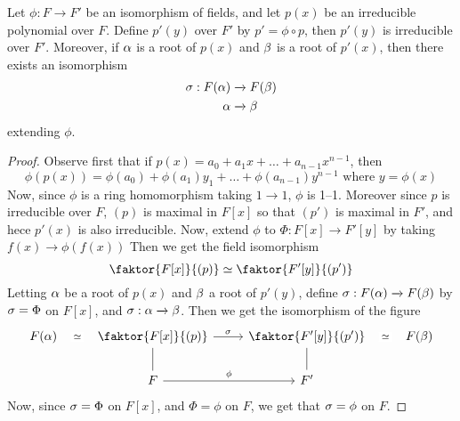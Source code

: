 \begin{theorem}\label{theorem_8.1.9}
  Let $\phi:F \xrightarrow{} F'$ be an isomorphism of fields, and let
  $p(x)$ be an irreducible polynomial over $F$. Define  $p'(y)$ over
  $F'$ by $p'=\phi \circ p$, then $p'(y)$ is irreducible over $F'$.
  Moreover, if $\alpha$ is a root of $p(x)$ and $\beta$ is a root of $p'(x)$,
  then there exists an isomorphism
  \begin{align*}
    \sigma: F(\alpha) & \xrightarrow{} F(\beta)  \\
    \alpha  & \xrightarrow{} \beta \\
  \end{align*}
  extending $\phi$.
\end{theorem}
\begin{proof}
  Observe first that if $p(x)=a_0+a_1x+\dots+a_{n-1}x^{n-1}$, then
  \begin{equation*}
    \phi(p(x))=\phi(a_0)+\phi(a_1)y_1+\dots+\phi(a_{n-1})y^{n-1}
    \text{ where } y=\phi(x)
  \end{equation*}
  Now, since $\phi$ is a ring homomorphism taking
  $1 \xrightarrow{} 1$, $\phi$ is 1--1. Moreover since $p$ is irreducible
  over $F$,  $(p)$ is maximal in $F[x]$ so that $(p')$ is maximal in
  $F'$, and hece $p'(x)$ is also irreducible. Now, extend $\phi$ to
  $\Phi:F[x] \xrightarrow{} F'[y]$ by taking $f(x) \xrightarrow{} \phi(f(x))$
  Then we get the field isomorphism
  \begin{equation*}
    \faktor{F[x]}{(p)} \simeq \faktor{F'[y]}{(p')}
  \end{equation*}
  Letting $\alpha$ be a root of $p(x)$ and $\beta$ a root of $p'(y)$, define
  $\sigma:F(\alpha) \xrightarrow{} F(\beta)$ by $\sigma=\Phi$ on $F[x]$, and $\sigma:\alpha
  \xrightarrow{} \beta$. Then we get the isomorphism of the figure
  \[\begin{tikzcd}
    {F(\a)} & {\faktor{F[x]}{(p)}} & {\faktor{F'[y]}{(p')}} & {F(\b)} \\
            & F & {F'}
            \arrow["\simeq"{description}, draw=none, from=1-1, to=1-2]
            \arrow["\s", from=1-2, to=1-3]
            \arrow["\simeq"{description}, draw=none, from=1-4, to=1-3]
            \arrow[no head, from=2-2, to=1-2]
            \arrow["\phi", from=2-2, to=2-3]
            \arrow[no head, from=2-3, to=1-3]
  \end{tikzcd}\]
  Now, since $\sigma=\Phi$ on $F[x]$, and $\Phi=\phi$ on $F$, we get that
  $\sigma=\phi$ on $F$.
\end{proof}

